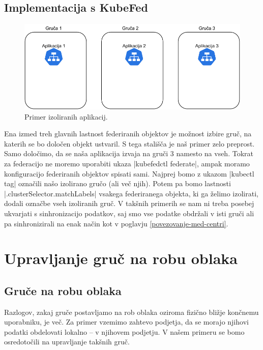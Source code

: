 \documentclass[a4paper, 12pt]{book}
\begin{document}
\section{Implementacija s KubeFed}
\begin{figure}[h]
\begin{center}
  \includegraphics[width=1.0\textwidth]{images/primer-izolirane-aplikacije.pdf}
\end{center}
\caption{Primer izoliranih aplikacij.}
\label{problem-prevelike-latence}
\end{figure}
Ena izmed treh glavnih lastnost federiranih objektov je možnost izbire gruč, na katerih se bo določen objekt ustvaril. 
S tega stališča je naš primer zelo preprost.
Samo določimo, da se naša aplikacija izvaja na gruči 3 namesto na vseh.
Tokrat za federacijo ne moremo uporabiti ukaza \spverb|kubefedctl federate|, ampak moramo konfiguracijo federiranih objektov spisati sami.
Najprej bomo z ukazom \spverb|kubectl tag| označili našo izolirano gručo (ali več njih).
Potem pa bomo lastnosti \spverb|.clusterSelector.matchLabels| vsakega federiranega objekta, ki ga želimo izolirati, dodali označbe vseh izoliranih gruč.
V takšnih primerih se nam ni treba posebej ukvarjati s sinhronizacijo podatkov, saj smo vse podatke obdržali v isti gruči ali pa sinhronizirali na enak način kot v poglavju \ref{povezovanje-med-centri}.
\chapter{Upravljanje gruč na robu oblaka}
\label{edge-clusters}
\section{Gruče na robu oblaka}
Razlogov, zakaj gruče postavljamo na rob oblaka oziroma fizično bližje konč\-ne\-mu uporabniku, je več.
Za primer vzemimo zahtevo podjetja, da se morajo njihovi podatki obdelovati lokalno -- v njihovem podjetju.
V našem primeru se bomo osredotočili na upravljanje takšnih gruč.
\end{document}
